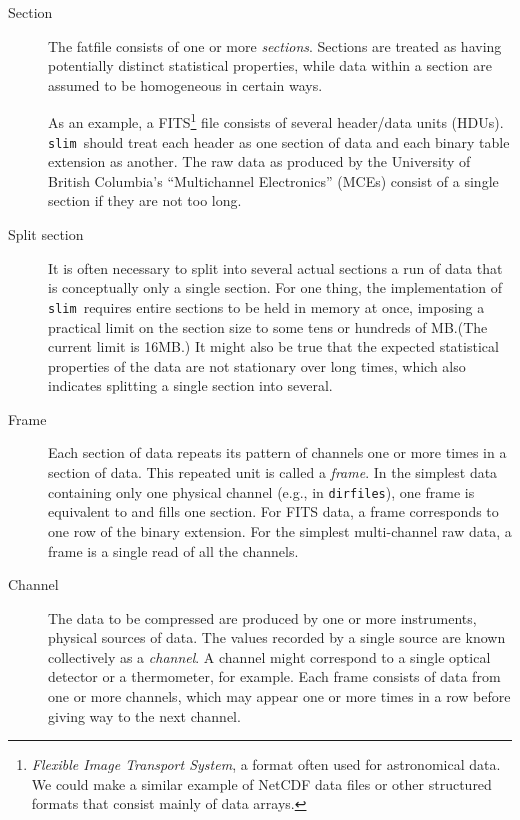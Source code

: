 \documentclass[11pt]{article}
\newcommand{\slim}{{\tt slim}}
\begin{document}
\begin{description}
\item[Section] The fatfile consists of one or more \emph{sections}.
  Sections are treated as having potentially distinct statistical
  properties, while data within a section are assumed to be homogeneous
  in certain ways.

  As an example, a FITS\footnote{\emph{Flexible Image Transport
  System}, a format often used for astronomical data.  We could make a
  similar example of NetCDF data files or other structured
  formats that consist mainly of data arrays.} file consists of
  several header/data units (HDUs).  \slim\ should treat each header
  as one section of data and each binary table extension as another.
  The raw data as produced by the University of British Columbia's
  ``Multichannel Electronics'' (MCEs) consist of a single section if
  they are not too long.

\item[Split section] It is often necessary to split into several
  actual sections a run of data that is conceptually only a single
  section.  For one thing, the implementation of \slim\ requires
  entire sections to be held in memory at once, imposing a practical
  limit on the section size to some tens or hundreds of MB.\@ (The
  current limit is 16MB.)  It might also be true that the expected
  statistical properties of the data are not stationary over long
  times, which also indicates splitting a single section into several.

\item[Frame] Each section of data repeats its pattern of channels one
  or more times in a section of data.  This repeated unit is called a
  {\em frame}.  In the simplest data containing only one physical
  channel (e.g., in {\tt dirfiles}), one frame is equivalent to and
  fills one section.  For FITS data, a frame corresponds to one row of
  the binary extension.  For the simplest multi-channel raw data, a
  frame is a single read of all the channels.

\item[Channel] The data to be compressed are produced by one or more
  instruments, physical sources of data.  The values recorded by a
  single source are known collectively as a \emph{channel}.  A channel
  might correspond to a single optical detector or a thermometer, for
  example.  Each frame consists of data from one or more channels,
  which may appear one or more times in a row before giving way to the
  next channel.


\end{description}
\end{document}
